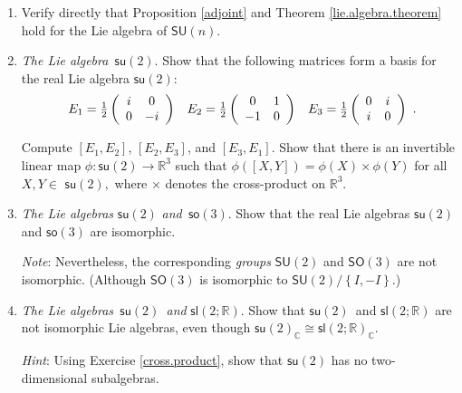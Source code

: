 \documentclass[12pt]{amsbook}
\theoremstyle{plain}
\numberwithin{equation}{chapter}
\numberwithin{theorem}{chapter}
\begin{document}
\begin{enumerate}
\item  Verify directly that Proposition \ref{adjoint} and Theorem
\ref{lie.algebra.theorem} hold for the Lie algebra of $\mathsf{SU}(n)$.

\item \label{cross.product}\textit{The Lie algebra}\emph{\ }$\mathsf{su}(2)$.
Show that the following matrices form a basis for the real Lie algebra
$\mathsf{su}(2)$:
\[%
\begin{array}
[c]{ccc}%
E_{1}=\tfrac{1}{2}\left(
\begin{array}
[c]{cc}%
i & 0\\
0 & -i
\end{array}
\right)   & E_{2}=\tfrac{1}{2}\left(
\begin{array}
[c]{cc}%
0 & 1\\
-1 & 0
\end{array}
\right)   & E_{3}=\tfrac{1}{2}\left(
\begin{array}
[c]{cc}%
0 & i\\
i & 0
\end{array}
\right)
\end{array}
\text{.}%
\]

Compute $[E_{1},E_{2}]$, $[E_{2},E_{3}]$, and $[E_{3},E_{1}]$. Show that there
is an invertible linear map $\phi:\mathsf{su}(2)\rightarrow\mathbb{R}^{3}$
such that $\phi(\left[  X,Y\right]  )=\phi(X)\times\phi(Y)$ for all $X,Y\in$
$\mathsf{su}(2),$ where $\times$ denotes the cross-product on $\mathbb{R}^{3}$.

\item \label{su2.iso.so3}\textit{The Lie algebras }$\mathsf{su}(2)$
\textit{and}\emph{\ }$\mathsf{so}(3)$. Show that the real Lie algebras
$\mathsf{su}(2)$ and $\mathsf{so}(3)$ are isomorphic.

\textit{Note}: Nevertheless, the corresponding \textit{groups} $\mathsf{SU}%
(2)$ and $\mathsf{SO}(3)$ are not isomorphic. (Although $\mathsf{SO}(3)$ is
isomorphic to $\mathsf{SU}(2)/\left\{  I,-I\right\}  $.)

\item \label{real.forms}\textit{The Lie algebras}\emph{\ }$\mathsf{su}%
(2)$\emph{\ \textit{and} }$\mathsf{sl}(2;\mathbb{R})$. Show that
$\mathsf{su}(2)$\emph{\ }and $\mathsf{sl}(2;\mathbb{R})$ are not isomorphic
Lie algebras, even though $\mathsf{su}(2)_{\mathbb{C}}\cong\mathsf{sl}%
(2;\mathbb{R})_{\mathbb{C}}$.

\textit{Hint}: Using Exercise \ref{cross.product}, show that $\mathsf{su}(2)$
has no two-dimensional subalgebras.


\end{enumerate}
\end{document}
